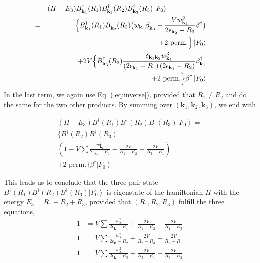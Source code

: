 \documentclass[aps,prb,superscriptaddress,showpacs,reprint,lengthcheck]{revtex4-1}
\begin{document}
\begin{eqnarray}  \label{eq:SchThree3}
&&(H-E _3)B^{\dagger}_{\mathbf{k} _1}(R_1)B^{\dagger}_{\mathbf{k}
_2}(R_2)B^{\dagger}_{\mathbf{k} _3}(R_3)\left|F_0\right>  \hspace{3cm}\nonumber\\
&=& \Bigl\{B^{\dagger}_{\mathbf{k} _1}(R_1)B^{\dagger}_{\mathbf{k}
_2}(R_2)\bigl(w_{\mathbf{k} _3}\beta^{\dagger}_{\mathbf{k} _3}-\frac{Vw_{%
\mathbf{k} _3}^2}{2\epsilon_{\mathbf{k} _2}-R_3}\beta^{\dagger}\bigr) \hspace{1cm}\nonumber\\
&&+\text{2 perm.} \Bigr\}\left|F_0\right> \hspace{1cm}\nonumber\\
&&+2V\Bigl\{B^{\dagger}_{\mathbf{k} _3}(R_3)\frac{\delta_{\mathbf{k} _1\mathbf{%
k} _2}w^3_{\mathbf{k} _1}}{\left(2\epsilon_{\mathbf{k} _1}-R_1\right)
\left(2\epsilon_{\mathbf{k} _1}-R_2\right) }\beta^{\dagger}_{\mathbf{k} _1}\hspace{1cm}\nonumber\\
&&\qquad+\text{2 perm.}\Bigr\} 
\beta^{\dagger}\left|F_0\right> \hspace{1cm} 
\end{eqnarray}
In the last term, we again use Eq. (\ref{eq:inverse}), provided that $R_1\neq{}%
R_2$ and do the same for the two other products. By summing over $%
\left(\mathbf{k} _1,\mathbf{k} _2,\mathbf{k} _3\right) $, we end with

\begin{multline}  \label{eq:SchThree4}
(H-E _3)B^{\dagger}(R_1)B^{\dagger}(R_2)B^{\dagger}(R_3)\left|F_0%
\right>  = \\
\{B^{\dagger}(R_2)B^{\dagger}(R_3) \\
\left(1-V\sum\frac{w_{\mathbf{k} _1}^2}{2\epsilon_{\mathbf{k} _1}-R_1}-\frac{2V%
}{R_1-R_2}+\frac{2V}{R_3-R_1}\right)  \\
+\text{2 perm.}\}\beta^{\dagger}\left|F_0\right>  
\end{multline}

This leads us to  conclude that the three-pair state $%
B^{\dagger}(R_1)B^{\dagger}(R_2)B^{\dagger}(R_3)\left|F_0\right>  $ is
eigenstate of the hamiltonian $H$ with the energy $E _3=R_1+R_2+R_3$,
provided that $\left(R_1,R_2, R_3\right) $ fulfill the three equations, 
\begin{equation}
\begin{split}
1&=V\sum\frac{w_{\mathbf{k} }^2}{2\epsilon_{\mathbf{k} }-R_1}+\frac{2V}{R_1-R_2%
}+\frac{2V}{R_1-R_3} \\
1&=V\sum\frac{w_{\mathbf{k} }^2}{2\epsilon_{\mathbf{k} }-R_2}+\frac{2V}{R_2-R_3%
}+\frac{2V}{R_2-R_1} \\
1&=V\sum\frac{w_{\mathbf{k} }^2}{2\epsilon_{\mathbf{k} }-R_3}+\frac{2V}{R_3-R_1%
}+\frac{2V}{R_3-R_2}
\end{split}%
\end{equation}
\end{document}
